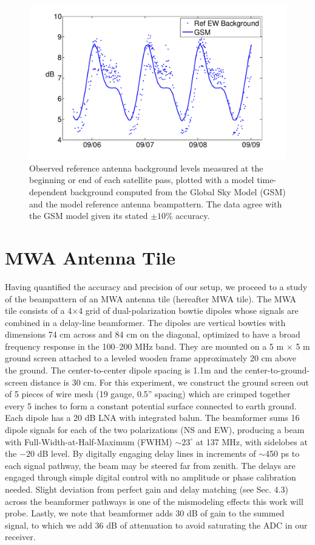 \begin{figure}
\includegraphics[width=5in]{chap1_precision_beammapping_figures/skynoise_null2.pdf}
\caption[Observed reference antenna background levels.]{Observed reference antenna background levels measured at the beginning or end of each satellite pass, plotted with a model time-dependent background computed from the Global Sky Model (GSM) \citep{gsm} and the model reference antenna beampattern. The data agree with the GSM model given its stated $\pm10$\% accuracy.}
\label{fig:skynoise}
\end{figure}

\section{MWA Antenna Tile}
\label{sec:mwatile}

Having quantified the accuracy and precision of our setup, we proceed to a study of the beampattern of an MWA antenna tile (hereafter MWA tile). The MWA tile consists of a 4$\times$4 grid of dual-polarization bowtie dipoles whose signals are combined in a delay-line beamformer. The dipoles are vertical bowties with dimensions 74 cm across and 84 cm on the diagonal, optimized to have a broad frequency response in the 100--200 MHz band. They are mounted on a 5 m $\times$ 5 m ground screen attached to a leveled wooden frame approximately 20 cm above the ground. The center-to-center dipole spacing is  1.1m and the center-to-ground-screen distance is 30 cm. For this experiment, we construct the ground screen out of 5 pieces of wire mesh (19 gauge, 0.5'' spacing) which are crimped together every 5 inches to form a constant potential surface connected to earth ground. Each dipole has a 20 dB LNA with integrated balun. The beamformer sums 16 dipole signals for each of the two polarizations (NS and EW), producing a beam with Full-Width-at-Half-Maximum (FWHM) $\sim23^\circ$ at 137 MHz, with sidelobes at the $-20$ dB level. By digitally engaging delay lines in increments of $\sim$450 ps to each signal pathway, the beam may be steered far from zenith. The delays are engaged through simple digital control with no amplitude or phase calibration needed. Slight deviation from perfect gain and delay matching (see Sec. 4.3) across the beamformer pathways is one of the mismodeling effects this work will probe. Lastly, we note that beamformer adds 30 dB of gain to the summed signal, to which we add 36 dB of attenuation to avoid saturating the ADC in our receiver. 

